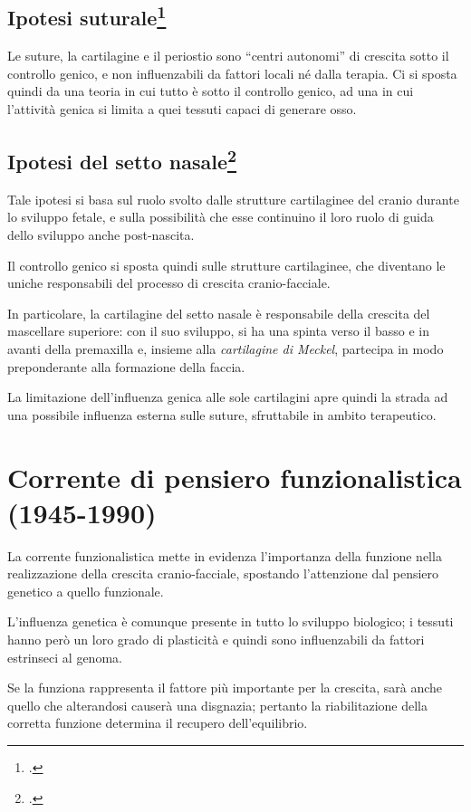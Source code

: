 \subsection*{Ipotesi suturale\protect\footcite{Weinmann1956}}
Le suture, la cartilagine e il periostio sono ``centri autonomi'' di crescita sotto il controllo genico, e non influenzabili da fattori locali né dalla terapia. Ci si sposta quindi da una teoria in cui tutto è sotto il controllo genico, ad una in cui l'attività genica si limita a quei tessuti capaci di generare osso.

\subsection*{Ipotesi del setto nasale\protect\footcite{Scott1967}}
Tale ipotesi si basa sul ruolo svolto dalle strutture cartilaginee del cranio durante lo sviluppo fetale, e sulla possibilità che esse continuino il loro ruolo di guida dello sviluppo anche post-nascita.

Il controllo genico si sposta quindi sulle strutture cartilaginee, che diventano le uniche responsabili del processo di crescita cranio-facciale.

In particolare, la cartilagine del setto nasale è responsabile della crescita del mascellare superiore: con il suo sviluppo, si ha una spinta verso il basso e in avanti della premaxilla e, insieme alla \textit{cartilagine di Meckel}, partecipa in modo preponderante alla formazione della faccia.

La limitazione dell'influenza genica alle sole cartilagini apre quindi la strada ad una possibile influenza esterna sulle suture, sfruttabile in ambito terapeutico.

\section{Corrente di pensiero funzionalistica (1945-1990)}
La corrente funzionalistica mette in evidenza l'importanza della funzione nella realizzazione della crescita cranio-facciale, spostando l'attenzione dal pensiero genetico a quello funzionale.

L'influenza genetica è comunque presente in tutto lo sviluppo biologico; i tessuti hanno però un loro grado di plasticità e quindi sono influenzabili da fattori estrinseci al genoma.

Se la funziona rappresenta il fattore più importante per la crescita, sarà anche quello che alterandosi causerà una disgnazia; pertanto la riabilitazione della corretta funzione determina il recupero dell'equilibrio.

